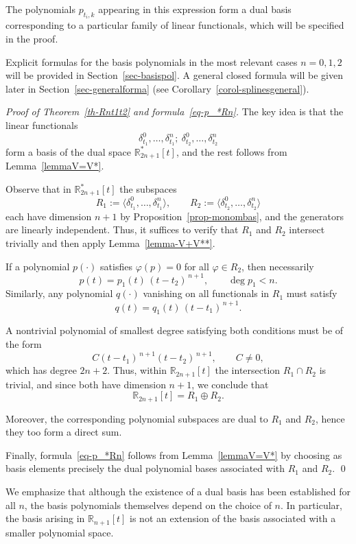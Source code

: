\documentclass{article}
\theoremstyle{definition}
\theoremstyle{definition}
\numberwithin{figure}{section}
\newcommand{\1}{\mathbf{1}}
\begin{document}
The polynomials $p_{t_i,k}$ appearing in this expression form a dual basis corresponding to a particular family of linear functionals, which will be specified in the proof.

Explicit formulas for the basis polynomials in the most relevant cases $n=0,1,2$ will be provided in Section~\ref{sec-basispol}. A general closed formula will be given later in Section~\ref{sec-generalforma} (see Corollary~\ref{corol-splinesgeneral}).

\medskip

\textit{Proof of Theorem~\ref{th-Rnt1t2} and formula~\eqref{eq-p_*Rn}.}
The key idea is that the linear functionals 
\[
    \delta^0_{t_1}, \dots, \delta^n_{t_1};\ 
    \delta^0_{t_2}, \dots, \delta^n_{t_2}
\]
form a basis of the dual space $\mathbb{R}^*_{2n+1}[t]$, and the rest follows from Lemma~\ref{lemmaV=V*}.

\bigskip

Observe that in $\mathbb{R}^*_{2n+1}[t]$ the subspaces
\[
    R_1 := \langle \delta^0_{t_1}, \dots, \delta^n_{t_1}\rangle,
    \qquad
    R_2 := \langle \delta^0_{t_2}, \dots, \delta^n_{t_2}\rangle
\]
each have dimension $n+1$ by Proposition~\ref{prop-monombas}, and the generators are linearly independent.  
Thus, it suffices to verify that $R_1$ and $R_2$ intersect trivially and then apply Lemma~\ref{lemma-V+V**}.

If a polynomial $p(\cdot)$ satisfies $\varphi(p)=0$ for all $\varphi\in R_2$, then necessarily
\[
    p(t) = p_1(t)\,(t - t_2)^{\,n+1},
    \qquad \deg p_1 < n.
\]
Similarly, any polynomial $q(\cdot)$ vanishing on all functionals in $R_1$ must satisfy
\[
    q(t) = q_1(t)\,(t - t_1)^{\,n+1}.
\]

A nontrivial polynomial of smallest degree satisfying both conditions must be of the form
\[
    C (t - t_1)^{\,n+1} (t - t_2)^{\,n+1}, \qquad C \neq 0,
\]
which has degree $2n+2$. Thus, within $\mathbb{R}_{2n+1}[t]$ the intersection $R_1 \cap R_2$ is trivial, and since both have dimension $n+1$, we conclude that
\[
    \mathbb{R}_{2n+1}[t] = R_1 \oplus R_2.
\]

Moreover, the corresponding polynomial subspaces are dual to $R_1$ and $R_2$, hence they too form a direct sum.

Finally, formula~\eqref{eq-p_*Rn} follows from Lemma~\ref{lemmaV=V*} by choosing as basis elements precisely the dual polynomial bases associated with $R_1$ and $R_2$.
\qed

\bigskip

We emphasize that although the existence of a dual basis has been established for all $n$, the basis polynomials themselves depend on the choice of $n$.  
In particular, the basis arising in $\mathbb{R}_{n+1}[t]$ is not an extension of the basis associated with a smaller polynomial space.
\end{document}
